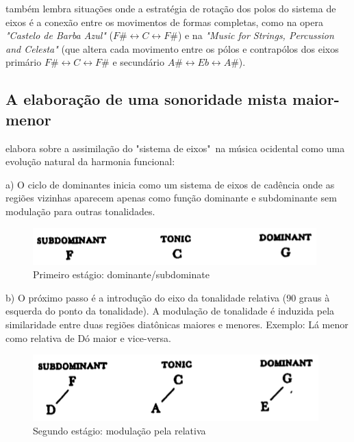 \documentclass[
	12pt,				%
	openright,			%
	twoside,			%
	a4paper,			%
	english,			%
	french,				%
	spanish,			%
	brazil				%
	]{abntex2}
\begin{document}
 também lembra situações onde a estratégia de rotação dos polos do sistema de eixos é a conexão entre os movimentos de formas completas, como na opera \textit{"Castelo de Barba Azul"} ($F\# \leftrightarrow  C \leftrightarrow F\#$) e na \textit{"Music for Strings, Percussion and Celesta" } (que altera cada movimento entre os pólos e contrapólos dos eixos primário $F\# \leftrightarrow  C \leftrightarrow F\#$ e secundário $A\# \leftrightarrow  Eb \leftrightarrow A\#$).
\pagebreak


\subsection{A elaboração de uma sonoridade mista maior-menor}

 elabora sobre a assimilação do "sistema de eixos"\ na música ocidental como uma evolução natural da harmonia funcional: 

a) O ciclo de dominantes inicia como um sistema de eixos de cadência onde as regiões vizinhas aparecem apenas como função dominante e subdominante sem modulação para outras tonalidades. 

\begin{figure}[!h]
	\caption{\label{fig_grafico}Primeiro estágio: dominante/subdominate}
	\begin{center}
	    \includegraphics[scale=0.5]{axis/estagio01.png}
	\end{center}
\end{figure}


b) O próximo passo é a introdução do eixo da tonalidade relativa (90 graus à esquerda do ponto da tonalidade). A modulação de tonalidade é induzida pela similaridade entre duas regiões diatônicas maiores e menores. Exemplo: Lá menor como relativa de Dó maior e vice-versa.

\begin{figure}[!h]
	\caption{\label{fig_grafico}Segundo estágio: modulação pela relativa}
	\begin{center}
	    \includegraphics[scale=0.5]{axis/estagio02.png}
	\end{center}
\end{figure}
\end{document}

